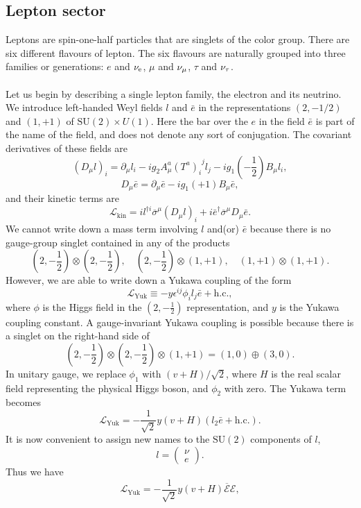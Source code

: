 \subsection{Lepton sector}
Leptons are spin-one-half particles that are singlets of the color group. There are six different flavours of lepton. The six flavours are naturally grouped into three families or generations: $e$ and $\nu_{\rm e}$, $\mu$ and $\nu_{\rm \mu}$, $\tau$ and $\nu_{\rm \tau}$.
\\ \\
Let us begin by describing a single lepton family, the electron and its neutrino. We introduce left-handed Weyl fields $l$ and $\bar{e}$ in the representations $(2,-{1}/{2})$ and $(1,+1)$ of $\mathrm{SU}(2)\times U(1)$. 
Here the bar over the $e$ in the field $\bar{e}$ is part of the name of the field, and does not denote any sort of conjugation. The covariant derivatives of these fields are
\[(D_{\mu}l)_i = \partial_{\mu}l_i - ig_2A^a_{\mu}(T^a)_{i}^{\phantom{j}j}l_j - ig_1(-\frac{1}{2})B_{\mu}l_i,\]
\[D_{\mu}\bar{e} = \partial_{\mu}\bar{e} - ig_1(+1)B_{\mu}\bar{e},\]
and their kinetic terms are
\[\mathcal{L}_{\mathrm{kin}} = il^{\dagger i} \overline{\sigma}^{\mu}(D_{\mu}l)_i + i\bar{e}^{\dagger}\overline{\sigma}^{\mu}D_{\mu}\bar{e}.\]
We cannot write down a mass term involving $l$ and(or) $\bar{e}$ because there is no gauge-group singlet contained in any of the products
\[(2,-\frac{1}{2}) \otimes (2,-\frac{1}{2}) , \quad (2,-\frac{1}{2}) \otimes (1, +1) , \quad (1, +1) \otimes (1, +1).\]
However, we are able to write down a Yukawa coupling of the form
\[\mathcal{L}_{\mathrm{Yuk}} \equiv -y\epsilon^{ij}\phi_i l_j \bar{e} + \mathrm{h.c.} ,\]
where $\phi$ is the Higgs field in the $(2,-\frac{1}{2})$ representation, and $y$ is the Yukawa coupling constant. A gauge-invariant Yukawa coupling is possible because there is a singlet on the right-hand side of
\[(2,-\frac{1}{2}) \otimes (2,-\frac{1}{2}) \otimes (1,+1) = (1,0) \oplus (3,0).\]
In unitary gauge, we replace $\phi_1$ with ${(v+H)}/ {\sqrt{2}}$, where $H$ is the real scalar field representing the physical Higgs boson, and $\phi_2$ with zero. The Yukawa term becomes
\[\mathcal{L}_{\mathrm{Yuk}} = -\frac{1}{\sqrt{2}}y(v+H)(l_2\bar{e} + \mathrm{h.c.}) .\]
It is now convenient to assign new names to the $\mathrm{SU}(2)$ components of $l$,
\[l = \begin{pmatrix}
\nu \\ e
\end{pmatrix} .\]
Thus we have
\[\mathcal{L}_{\mathrm{Yuk}} = -\frac{1}{\sqrt{2}}y(v+H)\overline{\mathcal{E}}\mathcal{E},\]
